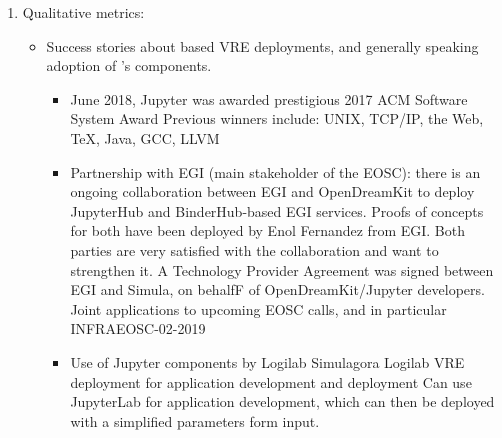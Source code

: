 \begin{enumerate}
\item Qualitative metrics:
\begin{itemize}
\item Success stories about \ODK based VRE deployments, and generally speaking adoption of \ODK's components.
\begin{itemize}
\item June 2018, Jupyter was awarded prestigious 2017 ACM Software System Award
Previous winners include: UNIX, TCP/IP, the Web, TeX, Java, GCC, LLVM

\item Partnership with EGI (main stakeholder of the EOSC): there is an ongoing collaboration between EGI and OpenDreamKit to deploy
JupyterHub and BinderHub-based EGI services. Proofs of concepts for both have been deployed by Enol Fernandez from EGI. Both parties
are very satisfied with the collaboration and want to strengthen it. A Technology Provider Agreement was signed between EGI and
Simula, on behalfF of OpenDreamKit/Jupyter developers. Joint applications to upcoming EOSC calls, and in particular INFRAEOSC-02-2019
  
\item Use of Jupyter components by Logilab
Simulagora
Logilab VRE deployment for application development and deployment
Can use JupyterLab for application development, which can then be deployed with a simplified parameters form input. %



\end{itemize}
\end{itemize}
\end{enumerate}
